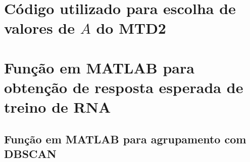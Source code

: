\begin{apendicesenv}
\chapter{Código utilizado para escolha de valores de $A$ do MTD2}
\label{ap:Avalue}

\chapter{Função em MATLAB para obtenção de resposta esperada de treino de RNA}
\label{ap:idMoves}

\end{apendicesenv}

	\begin{anexosenv}
	\partanexos
\chapter{Função em MATLAB para agrupamento com DBSCAN \cite{Thanh2013}}
\label{ap:dbscan}

\end{anexosenv}


